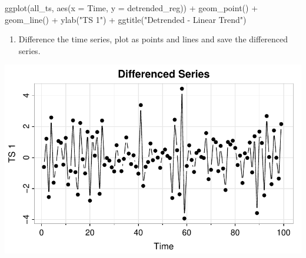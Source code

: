 \documentclass[
  letterpaper,
  DIV=11,
  numbers=noendperiod]{scrartcl}
\newenvironment{Shaded}{\begin{snugshade}}{\end{snugshade}}
\newcommand{\AttributeTok}[1]{\textcolor[rgb]{0.40,0.45,0.13}{#1}}
\newcommand{\ConstantTok}[1]{\textcolor[rgb]{0.56,0.35,0.01}{#1}}
\newcommand{\DecValTok}[1]{\textcolor[rgb]{0.68,0.00,0.00}{#1}}
\newcommand{\FunctionTok}[1]{\textcolor[rgb]{0.28,0.35,0.67}{#1}}
\newcommand{\NormalTok}[1]{\textcolor[rgb]{0.00,0.23,0.31}{#1}}
\newcommand{\OtherTok}[1]{\textcolor[rgb]{0.00,0.23,0.31}{#1}}
\newcommand{\SpecialCharTok}[1]{\textcolor[rgb]{0.37,0.37,0.37}{#1}}
\newcommand{\StringTok}[1]{\textcolor[rgb]{0.13,0.47,0.30}{#1}}
\providecommand{\tightlist}{%
  \setlength{\itemsep}{0pt}\setlength{\parskip}{0pt}}\usepackage{longtable,booktabs,array}
\begin{document}
\begin{Shaded}
\begin{Highlighting}[]
\FunctionTok{ggplot}\NormalTok{(all\_ts, }\FunctionTok{aes}\NormalTok{(}\AttributeTok{x =}\NormalTok{ Time, }\AttributeTok{y =}\NormalTok{ detrended\_reg)) }\SpecialCharTok{+} \FunctionTok{geom\_point}\NormalTok{() }\SpecialCharTok{+} \FunctionTok{geom\_line}\NormalTok{() }\SpecialCharTok{+} 
  \FunctionTok{ylab}\NormalTok{(}\StringTok{"TS 1"}\NormalTok{) }\SpecialCharTok{+} \FunctionTok{ggtitle}\NormalTok{(}\StringTok{"Detrended {-} Linear Trend"}\NormalTok{)}
\end{Highlighting}
\end{Shaded}

\begin{enumerate}
\def\labelenumi{\arabic{enumi}.}
\setcounter{enumi}{6}
\tightlist
\item
  Difference the time series, plot as points and lines and save the
  differenced series.
\end{enumerate}

\begin{Shaded}
\end{Shaded}

\includegraphics{Lecture7_files/figure-pdf/astsa-act2-p7-1.pdf}
\end{document}
